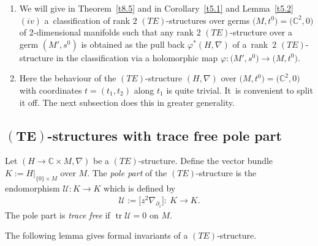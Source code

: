 \documentclass[10pt,a4paper]{amsart}
\numberwithin{equation}{section}
\numberwithin{figure}{section}
\newcommand{\C}{{\mathbb C}}
\newcommand{\UU}{{\mathcal U}}
\newcommand{\paa}{\partial}
\newcommand{\nnn}{\nabla}
\DeclareMathOperator{\tr}{tr}
\begin{document}
\begin{Remarks}\qquad%
\begin{enumerate}\itemsep=0pt
\item[$(i)$] We will give in Theorem~\ref{t8.5}
and in Corollary~\ref{t5.1} and Lemma~\ref{t5.2}$(iv)$
a~classification of rank $2$ $(TE)$-structures
over germs $\big(M,t^0\big)=\big(\C^2,0\big)$ of 2-dimensional manifolds
such that any rank $2$ $(TE)$-structure over a germ
$(M',s^0)$ is obtained as the pull back $\varphi^*(H,\nnn)$
of a~rank~2 $(TE)$-structure in the classification
via a holomorphic map $\varphi\colon \big(M',s^0\big)\to \big(M,t^0\big)$.

\item[$(ii)$] Here the behaviour of the $(TE)$-structure $(H,\nnn)$
over $\big(M,t^0\big)=\big(\C^2,0\big)$ with coordinates $t=(t_1,t_2)$
along $t_1$ is quite trivial. It~is convenient to
split it off. The next subsection does this in greater
generality.
\end{enumerate}
\end{Remarks}

\subsection[$(TE)$-structures with trace free pole part]{$\boldsymbol{(TE)}$-structures with trace free pole part}

\begin{Definition}\label{t3.8}
Let $(H\to\C\times M,\nnn)$ be a $(TE)$-structure.
Define the vector bundle $K:=H|_{\{0\}\times M}$ over $M$.
The {\it pole part} of the $(TE)$-structure is the endomorphism
$\UU\colon K\to K$ which is defined by
\begin{eqnarray}\label{3.16}
\UU:=\big[z^2\nnn_{\paa_z}\big]\colon\ K\to K.
\end{eqnarray}
The pole part is {\it trace free} if $\tr\UU=0$ on $M$.
\end{Definition}

The following lemma gives formal invariants of a $(TE)$-structure.
\end{document}
